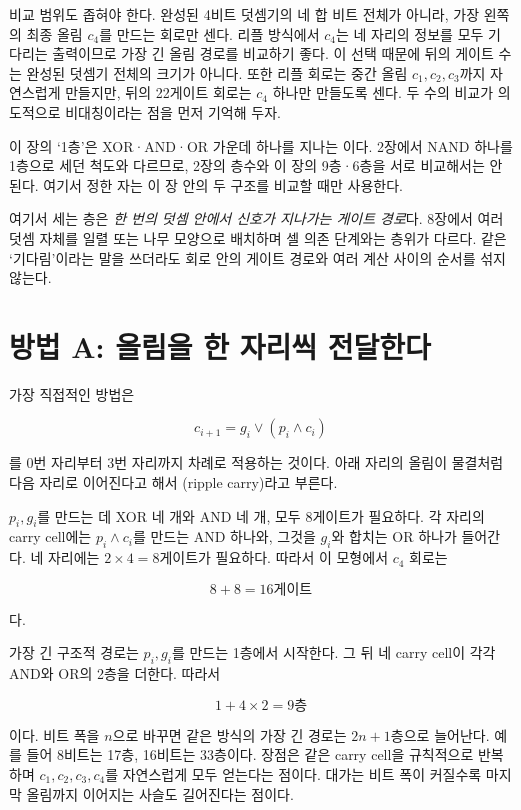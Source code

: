 비교 범위도 좁혀야 한다. 완성된 4비트 덧셈기의 네 합 비트 전체가 아니라, 가장 왼쪽의 최종 올림 \(c_4\)를 만드는 회로만 센다. 리플 방식에서 \(c_4\)는 네 자리의 정보를 모두 기다리는 출력이므로 가장 긴 올림 경로를 비교하기 좋다. 이 선택 때문에 뒤의 게이트 수는 완성된 덧셈기 전체의 크기가 아니다. 또한 리플 회로는 중간 올림 \(c_1,c_2,c_3\)까지 자연스럽게 만들지만, 뒤의 22게이트 회로는 \(c_4\) 하나만 만들도록 센다. 두 수의 비교가 의도적으로 비대칭이라는 점을 먼저 기억해 두자.

이 장의 ‘1층’은 XOR·AND·OR 가운데 하나를 지나는 이다. 2장에서 NAND 하나를 1층으로 세던 척도와 다르므로, 2장의 층수와 이 장의 9층·6층을 서로 비교해서는 안 된다. 여기서 정한 자는 이 장 안의 두 구조를 비교할 때만 사용한다.

여기서 세는 층은 \emph{한 번의 덧셈 안에서 신호가 지나가는 게이트 경로}다. 8장에서 여러 덧셈 자체를 일렬 또는 나무 모양으로 배치하며 셀 의존 단계와는 층위가 다르다. 같은 ‘기다림’이라는 말을 쓰더라도 회로 안의 게이트 경로와 여러 계산 사이의 순서를 섞지 않는다.

\section{방법 A: 올림을 한 자리씩 전달한다}

가장 직접적인 방법은

\[
  c_{i+1}=g_i\mathbin{\lor}(p_i\mathbin{\land}c_i)
\]

를 0번 자리부터 3번 자리까지 차례로 적용하는 것이다. 아래 자리의 올림이 물결처럼 다음 자리로 이어진다고 해서 (ripple carry)라고 부른다\parencite{mit6896fastaddition,mit6111arithmetic}.

\(p_i,g_i\)를 만드는 데 XOR 네 개와 AND 네 개, 모두 8게이트가 필요하다. 각 자리의 carry cell에는 \(p_i\land c_i\)를 만드는 AND 하나와, 그것을 \(g_i\)와 합치는 OR 하나가 들어간다. 네 자리에는 \(2\times4=8\)게이트가 필요하다. 따라서 이 모형에서 \(c_4\) 회로는

\[
  8+8=16\text{게이트}
\]

다.

가장 긴 구조적 경로는 \(p_i,g_i\)를 만드는 1층에서 시작한다. 그 뒤 네 carry cell이 각각 AND와 OR의 2층을 더한다. 따라서

\[
  1+4\times2=9\text{층}
\]

이다. 비트 폭을 \(n\)으로 바꾸면 같은 방식의 가장 긴 경로는 \(2n+1\)층으로 늘어난다. 예를 들어 8비트는 17층, 16비트는 33층이다. 장점은 같은 carry cell을 규칙적으로 반복하며 \(c_1,c_2,c_3,c_4\)를 자연스럽게 모두 얻는다는 점이다. 대가는 비트 폭이 커질수록 마지막 올림까지 이어지는 사슬도 길어진다는 점이다.

